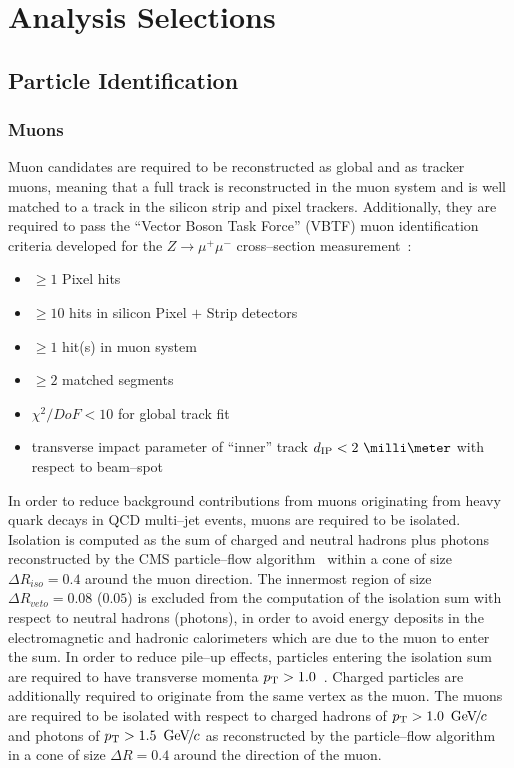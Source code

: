 \ifx\master\undefined\fi

\chapter{Analysis Selections}
\label{ch:selections}

\section{Particle Identification}
\subsection{Muons}
\label{sec:MuonId}

Muon candidates are required to be reconstructed as global and as tracker muons,
meaning that a full track is reconstructed in the muon system and is well
matched to a track in the silicon strip and pixel trackers.
Additionally, they are required to pass the ``Vector Boson Task Force'' (VBTF)
muon identification criteria developed for the $Z \to \mu^{+} \mu^{-}$
cross--section measurement~\cite{CMS-PAS-EWK-10-002}:
\begin{itemize}
\item $\geq 1$ Pixel hits
\item $\geq 10$ hits in silicon Pixel $+$ Strip detectors
\item $\geq 1$ hit(s) in muon system
\item $\geq 2$ matched segments
\item $\chi^{2}/DoF < 10$ for global track fit
\item transverse impact parameter of ``inner'' track $d_\text{IP} < 2~\milli\meter$
  with respect to beam--spot
\end{itemize}

In order to reduce background contributions from muons originating from heavy
quark decays in QCD multi--jet events, muons are required to be isolated.
Isolation is computed as the \pt sum of charged and neutral hadrons plus photons
reconstructed by the CMS particle--flow algorithm~\cite{PFT-09-001} within a
cone of size $\Delta R_{iso} = 0.4$ around the muon direction.  The innermost
region of size $\Delta R_{veto} = 0.08$ ($0.05$) is excluded from the
computation of the isolation \pt sum with respect to neutral hadrons (photons),
in order to avoid energy deposits in the electromagnetic and hadronic
calorimeters which are due to the muon to enter the sum.  In order to reduce
pile--up effects, particles entering the isolation \pt sum are required to have
transverse momenta $p_{\mathrm{T}} > 1.0$~\GeVc.  Charged particles are additionally
required to originate from the same vertex as the muon.  The muons are required
to be isolated with respect to charged hadrons of $p_{\mathrm{T}} > 1.0~{\,\text{Ge\hspace{-.08em}V\hspace{-0.16em}/\hspace{-0.08em}}c}$ and photons
of $p_{\mathrm{T}} > 1.5~{\,\text{Ge\hspace{-.08em}V\hspace{-0.16em}/\hspace{-0.08em}}c}$ as reconstructed by the particle--flow
algorithm~\cite{CMS-PAS-PFT-09-001} in a cone of size $\Delta R = 0.4$ around
the direction of the muon.

